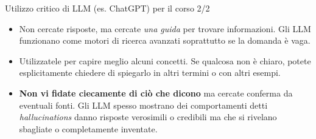 \documentclass[
  ignorenonframetext,
]{beamer}
\begin{document}
\begin{frame}{Utilizzo critico di LLM (es. ChatGPT) per il corso 2/2}
\label{utilizzo-critico-di-llm-es.-chatgpt-per-il-corso-22}
\begin{itemize}
\item
  Non cercate risposte, ma cercate \emph{una guida} per trovare
  informazioni. Gli LLM funzionano come motori di ricerca avanzati
  soprattutto se la domanda è vaga.
\item
  Utilizzatele per capire meglio alcuni concetti. Se qualcosa non è
  chiaro, potete esplicitamente chiedere di spiegarlo in altri termini o
  con altri esempi.
\item
  \textbf{Non vi fidate ciecamente di ciò che dicono} ma cercate
  conferma da eventuali fonti. Gli LLM spesso mostrano dei comportamenti
  detti \emph{hallucinations} danno risposte verosimili o credibili ma
  che si rivelano sbagliate o completamente inventate.
\end{itemize}
\end{frame}
\end{document}
